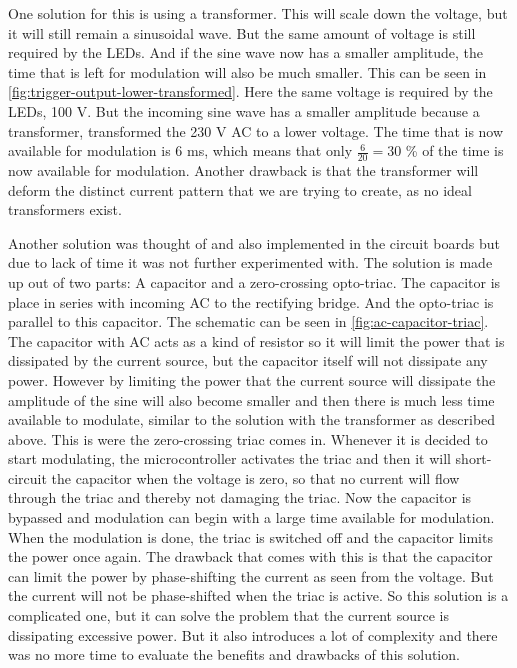 	One solution for this is using a transformer.
	This will scale down the voltage, but it will still remain a sinusoidal wave.
	But the same amount of voltage is still required by the LEDs.
	And if the sine wave now has a smaller amplitude, the time that is left for modulation will also be much smaller.
	This can be seen in \autoref{fig:trigger-output-lower-transformed}.
	Here the same voltage is required by the LEDs, 100 V.
	But the incoming sine wave has a smaller amplitude because a transformer, transformed the 230 V AC to a lower voltage.
	The time that is now available for modulation is 6 ms, which means that only $\frac{6}{20} = 30$ \% of the time is now available for modulation.
	Another drawback is that the transformer will deform the distinct current pattern that we are trying to create, as no ideal transformers exist.

	Another solution was thought of and also implemented in the circuit boards but due to lack of time it was not further experimented with.
	The solution is made up out of two parts: A capacitor and a zero-crossing opto-triac.
	The capacitor is place in series with incoming AC to the rectifying bridge.
	And the opto-triac is parallel to this capacitor.
	The schematic can be seen in \autoref{fig:ac-capacitor-triac}.
	The capacitor with AC acts as a kind of resistor so it will limit the power that is dissipated by the current source, but the capacitor itself will not dissipate any power.
	However by limiting the power that the current source will dissipate the amplitude of the sine will also become smaller and then there is much less time available to modulate, similar to the solution with the transformer as described above.
	This is were the zero-crossing triac comes in.
	Whenever it is decided to start modulating, the microcontroller activates the triac and then it will short-circuit the capacitor when the voltage is zero, so that no current will flow through the triac and thereby not damaging the triac.
	Now the capacitor is bypassed and modulation can begin with a large time available for modulation.
	When the modulation is done, the triac is switched off and the capacitor limits the power once again.
	The drawback that comes with this is that the capacitor can limit the power by phase-shifting the current as seen from the voltage.
	But the current will not be phase-shifted when the triac is active.
	So this solution is a complicated one, but it can solve the problem that the current source is dissipating excessive power.
	But it also introduces a lot of complexity and there was no more time to evaluate the benefits and drawbacks of this solution.




